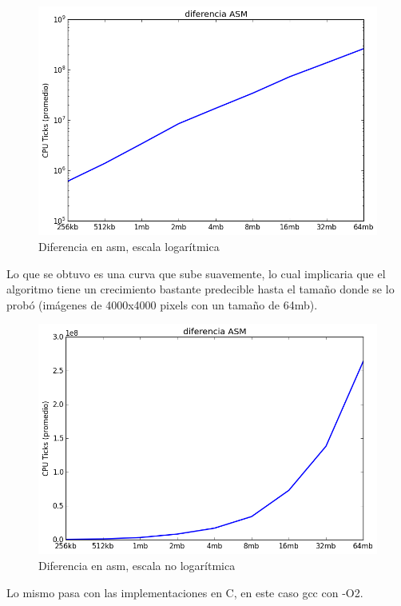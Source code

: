\documentclass[a4paper]{article}
\begin{document}
\begin{figure}[h]
	\includegraphics[scale=0.60]{imagenes/test_performance_size_ASM.png}
	\caption{Diferencia en asm, escala logarítmica}
\end{figure}

\noindent Lo que se obtuvo es una curva que sube suavemente, lo cual implicaria que el algoritmo tiene un crecimiento bastante predecible hasta el tamaño donde se lo probó (imágenes de 4000x4000 pixels con un tamaño de 64mb).

\begin{figure}[h]
	\includegraphics[scale=0.60]{imagenes/test_performance_size_ASM_not_log.png}
	\caption{Diferencia en asm, escala no logarítmica}
\end{figure}

\newpage 

Lo mismo pasa con las implementaciones en C, en este caso gcc con -O2.
\end{document}
